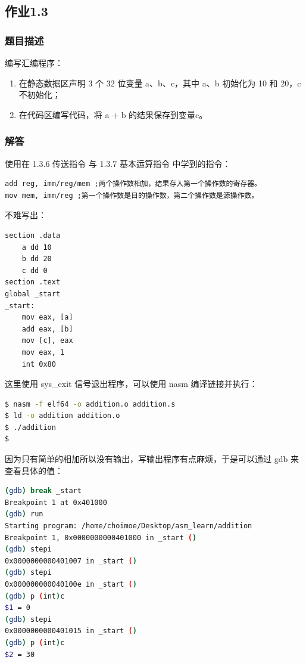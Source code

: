 \subsection{作业1.3}
\subsubsection{题目描述}
编写汇编程序：
\begin{enumerate}
    \item 在静态数据区声明 3 个 32 位变量 a、b、c，其中 a、b 初始化为 10 和 20，c 不初始化；
    \item 在代码区编写代码，将 a + b 的结果保存到变量c。
\end{enumerate}
\subsubsection{解答}

使用在 1.3.6 传送指令 与 1.3.7 基本运算指令 中学到的指令：

\begin{lstlisting}[language={[x86masm]Assembler},title={指令集}]
add reg, imm/reg/mem ;两个操作数相加，结果存入第一个操作数的寄存器。
mov mem, imm/reg ;第一个操作数是目的操作数，第二个操作数是源操作数。
\end{lstlisting}

不难写出：

\begin{lstlisting}[language={[x86masm]Assembler},title={addition.s}]
section .data
    a dd 10
    b dd 20
    c dd 0
section .text
global _start
_start:
    mov eax, [a]
    add eax, [b]
    mov [c], eax
    mov eax, 1
    int 0x80
\end{lstlisting}

这里使用 sys\_exit 信号退出程序，可以使用 nasm 编译链接并执行：

\begin{lstlisting}[language=bash,title={bash}]
$ nasm -f elf64 -o addition.o addition.s
$ ld -o addition addition.o
$ ./addition
$ 
\end{lstlisting}

因为只有简单的相加所以没有输出，写输出程序有点麻烦，于是可以通过 gdb 来查看具体的值：

\begin{lstlisting}[language=bash,title={gdb}]
(gdb) break _start
Breakpoint 1 at 0x401000
(gdb) run
Starting program: /home/choimoe/Desktop/asm_learn/addition 
Breakpoint 1, 0x0000000000401000 in _start ()
(gdb) stepi
0x0000000000401007 in _start ()
(gdb) stepi
0x000000000040100e in _start ()
(gdb) p (int)c
$1 = 0
(gdb) stepi
0x0000000000401015 in _start ()
(gdb) p (int)c
$2 = 30
\end{lstlisting}


